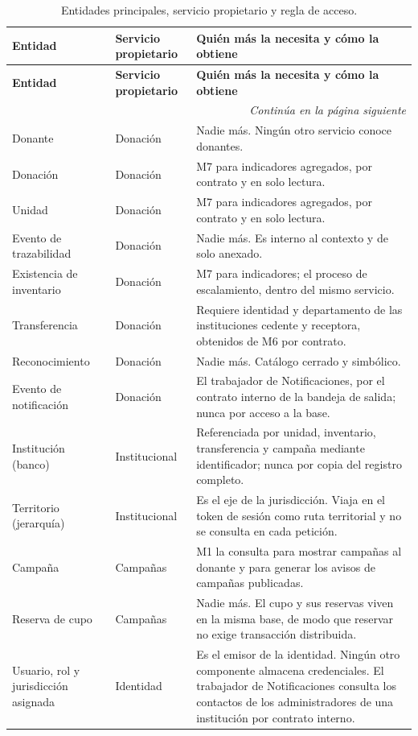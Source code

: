 \documentclass[11pt,a4paper]{article}
\newcommand{\contlinea}[1]{\multicolumn{#1}{r}{\footnotesize\itshape Continúa en la página siguiente}}
\begin{document}
\begin{longtable}{L{3.4cm} L{5.0cm} L{5.8cm}}
\caption{Entidades principales, servicio propietario y regla de acceso.}\label{tab:entidades}\\
\toprule
\textbf{Entidad} & \textbf{Servicio propietario} & \textbf{Quién más la necesita y cómo la obtiene} \\
\midrule
\endfirsthead
\toprule
\textbf{Entidad} & \textbf{Servicio propietario} & \textbf{Quién más la necesita y cómo la obtiene} \\
\midrule
\endhead
\midrule
\contlinea{3} \\
\endfoot
\bottomrule
\endlastfoot
Donante & Donación & Nadie más. Ningún otro servicio conoce donantes. \\
Donación & Donación & M7 para indicadores agregados, por contrato y en solo lectura. \\
Unidad & Donación & M7 para indicadores agregados, por contrato y en solo lectura. \\
Evento de trazabilidad & Donación & Nadie más. Es interno al contexto y de solo anexado. \\
Existencia de inventario & Donación & M7 para indicadores; el proceso de escalamiento, dentro del mismo servicio. \\
Transferencia & Donación & Requiere identidad y departamento de las instituciones cedente y receptora, obtenidos de M6 por contrato. \\
Reconocimiento & Donación & Nadie más. Catálogo cerrado y simbólico. \\
Evento de notificación & Donación & El trabajador de Notificaciones, por el contrato interno de la bandeja de salida; nunca por acceso a la base. \\
Institución (banco) & Institucional & Referenciada por unidad, inventario, transferencia y campaña mediante identificador; nunca por copia del registro completo. \\
Territorio (jerarquía) & Institucional & Es el eje de la jurisdicción. Viaja en el token de sesión como ruta territorial y no se consulta en cada petición. \\
Campaña & Campañas & M1 la consulta para mostrar campañas al donante y para generar los avisos de campañas publicadas. \\
Reserva de cupo & Campañas & Nadie más. El cupo y sus reservas viven en la misma base, de modo que reservar no exige transacción distribuida. \\
Usuario, rol y jurisdicción asignada & Identidad & Es el emisor de la identidad. Ningún otro componente almacena credenciales. El trabajador de Notificaciones consulta los contactos de los administradores de una institución por contrato interno. \\

\end{longtable}
\end{document}
